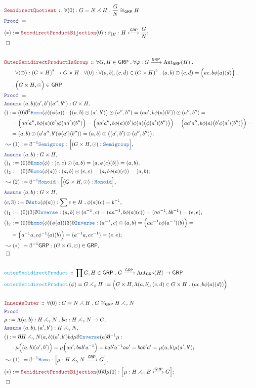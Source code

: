 \documentclass[12pt]{scrartcl}
\newcommand{\TYPE}[1]{\textcolor{NavyBlue}{\mathtt{#1}}}
\newcommand{\FUNC}[1]{\textcolor{Cerulean}{\mathtt{#1}}}
\newcommand{\LOGIC}[1]{\textcolor{Blue}{\mathtt{#1}}}
\newcommand{\THM}[1]{\textcolor{Maroon}{\mathtt{#1}}}
\renewcommand{\.}{\; . \;}
\newcommand{\de}{: \kern 0.1pc =}
\newcommand{\Act}[1]{\left( #1 \right)}
\newcommand{\Theorem}[2]{& \THM{#1} \, :: \, #2 \\ & \Proof = \\ }
\newcommand{\DeclareFunc}[2]{& \FUNC{#1} \, :: \, #2 \\}
\newcommand{\DefineNamedFunc}[4]{&  \FUNC{#1}\Act{#2} = #3 \de #4 \\}
\newcommand{\NewLine}{\\ & \kern 1pc}
\newcommand{\Page}[1]{ \begin{align*} #1 \end{align*}   }
\newcommand{ \bd }{ \ByDef }
\newcommand{\Aut}{\mathrm{Aut}}
\newcommand{\Say}[3]{& #1 \de #2 : #3, \\}
\newcommand{\Conclude}[3]{& #1 \de #2 : #3; \\}
\newcommand{\Derive}[3]{& \leadsto #1 \de #2 : #3, \\}
\newcommand{\Assume}[2]{& \LOGIC{Assume} \; #1 : #2, \\}
\newcommand{\QED}{\; \square}
\newcommand{\EndProof}{& \QED \\}
\newcommand{\ByDef}{\eth}
\newcommand{\Proof}{\LOGIC{Proof} \; }
\newcommand{\Arrow}[1]{\xrightarrow{#1}}
\newcommand{\ToIso}[1]{\xleftrightarrow{#1}}
\newcommand{\GRP}{\mathsf{GRP}}
\newcommand{\SDP}{\rightthreetimes}
\begin{document}
\Page{
	\Theorem{SemidirectQuotient}{ \forall (0) : G = N \SDP H \. \frac{G}{N} \cong_\GRP  H  }
	\Conclude{(*)}{\THM{SemodirectProductBijection}(0)}{\pi_{|H} : H \ToIso{\GRP} \frac{G}{N}}
	\EndProof
	\\
	\Theorem{OuterSemidirectProductIsGroup}{ 
		\forall G,H \in \GRP \. \forall \varphi : G \Arrow{\GRP} \Aut_\GRP(H) \. \NewLine \.
		\forall (\odot) : (G \times H)^2 \to G \times H \. 
		\forall (0) : \forall (a,b),(c,d) \in (G \times H)^2 \. (a,b) \odot (c,d) = \Big(ac,  b \phi(a)(d) \Big)  \.
		\NewLine \. \Big(  G \times H, \odot \Big) \in \GRP
	}
	\Assume{(a,b)(a',b')(a'',b'')}{G \times H}
	\Conclude{()}{ (0) \bd^2 \TYPE{Homo}(\phi)(\phi(a))  }{
			\big((a,b) \odot (a',b') \big) \odot (a'',b'') = 
			(aa', b \phi(a)(b')) \odot (a'',b'') = \NewLine = 
			\Big( aa'a'', b \phi(a)(b')\phi(aa')(b'') \Big)  = 
			\Big( aa'a'', b \phi(a)(b')\phi(a)\big(\phi(a')(b'')\big) \Big) =
			\Big( aa'a'', b \phi(a)\big(b'\phi(a')(b'')\big) \Big) = \NewLine = 
			(a,b) \odot (a'a'', b'(\phi(a')(b''))  =
			(a,b) \odot \big( (a',b') \odot (a'',b'') \big)
		}
	\Derive{(1)}{\bd^{-1} \TYPE{Semigroup}}{\Big[ ( G \times H, \odot): \TYPE{Semigroup} \Big] }
	\Assume{(a,b)}{G \times H}
	\Say{()_1}{ (0) \bd \TYPE{Homo}(\phi)   }{ (e,e) \odot (a,b) = (a, \phi(e)(b)) = (a,b) }
	\Conclude{()_2}{ (0) \bd \TYPE{Homo}(\phi(a))  }{(a,b) \odot (e,e) = (a, b \phi(a)(e) ) = (a,b)}
	\Derive{(2)}{\bd^{-1} \TYPE{Monoid}}{\Big[ (G \times H, \odot) : \TYPE{Monoid} \Big]}
	\Assume{(a,b)}{G \times H}
	\Say{(c,3)}{\bd \TYPE{Auto}(\phi(a))}{\sum c \in H \. \phi(a)(c) = b^{-1}}
	\Say{()_1}{(0)(3)\bd \TYPE{Inverse} }{ (a,b) \odot (a^{-1},c) = (aa^{-1}, b\phi(a)(c)) = (aa^{-1},bb^{-1}) = (e,e)}
	\Conclude{()_2}{ (0)\bd \TYPE{homo}(\phi)(\phi(a))(3) \bd \TYPE{Inverse} }
	{ 
		(a^{-1},c) \odot (a,b) = 
		\Big(aa^{-1} c\phi(a^{-1})(b) \Big) = \NewLine = 
		\Big(a^{-1}a,c\phi^{-1}(a)(b)\Big) = 
		(a^{-1}a,cc^{-1}) = 
		(e,e)   
	}
	\Derive{(*)}{\bd^{-1}\GRP}{ (G \times G,\odot) \in \GRP}
	\EndProof
	\\
	\DeclareFunc{outerSemidirectProduct}{\prod G,H \in \GRP \. G \Arrow{\GRP} \Aut_{\GRP}(H) \to \GRP}
	\DefineNamedFunc{outerSemidirectProduct}{\phi}{G \SDP_\phi H}{\Big( G \times H, \Lambda (a,b),(c,d) \in G \times H \. (ac,b\phi(a)(d)) \Big)}
	\\
	\Theorem{InnerAsOuter}{\forall (0) : G = N \SDP H \. G \cong_\GRP  H \SDP_{\gamma} N}
	\Say{\mu}{ \Lambda (a,b) : H \SDP_{\gamma} N \. ba }{ H \SDP_{\gamma} N \to G  }
	\Assume{(a,b),(a',b')}{H \SDP_{\gamma} N}
	\Conclude{()}{\bd H \SDP_{\gamma} N (a,b)(a',b') bd \mu \bd \TYPE{Inverse}(a) \bd^{-1}\mu }{ 
			\NewLine :
			\mu\Big( (a,b)(a',b')  \Big)  = 
			\mu\Big( aa', bab'a^{-1}  \Big) = 
			bab'a^{-1}aa' = 
			bab'a' =
			\mu(a,b)\mu(a',b')
		}
	\Derive{(1)}{\bd^{-1} \TYPE{Homo}}{\Big[ \mu : H \SDP_\gamma N \Arrow{\GRP} G  \Big]}
	\Conclude{(*)}{\THM{SemidirectProductBijection}(0)\bd \mu (1) }{\Big[ \mu : H \SDP_\gamma B \ToIso{\GRP} G \Big]}
	\EndProof
}
\end{document}
